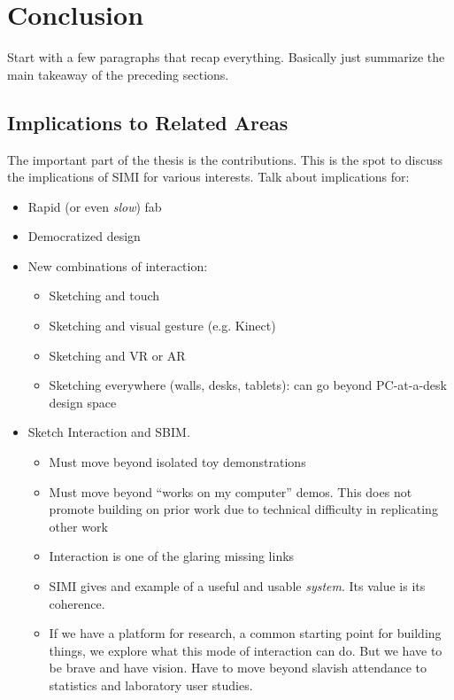 \chapter{Conclusion}


Start with a few paragraphs that recap everything. Basically just
summarize the main takeaway of the preceding sections.

\section{Implications to Related Areas}

The important part of the thesis is the contributions. This is the
spot to discuss the implications of SIMI for various interests. Talk
about implications for:

\begin{itemize}
\item Rapid (or even \textit{slow}) fab
\item Democratized design
\item New combinations of interaction:
  \begin{itemize}
  \item Sketching and touch
  \item Sketching and visual gesture (e.g. Kinect)
  \item Sketching and VR or AR
  \item Sketching everywhere (walls, desks, tablets): can go beyond PC-at-a-desk design space
  \end{itemize}
\item Sketch Interaction and SBIM. 
  \begin{itemize}
  \item Must move beyond isolated toy demonstrations
  \item Must move beyond ``works on my computer'' demos. This does not
    promote building on prior work due to technical difficulty in
    replicating other work
  \item Interaction is one of the glaring missing links
  \item SIMI gives and example of a useful and usable
    \textit{system}. Its value is its coherence.
  \item If we have a platform for research, a common starting point
    for building things, we explore what this mode of interaction can
    do. But we have to be brave and have vision. Have to move beyond
    slavish attendance to statistics and laboratory user studies.
  \end{itemize}
\end{itemize}

